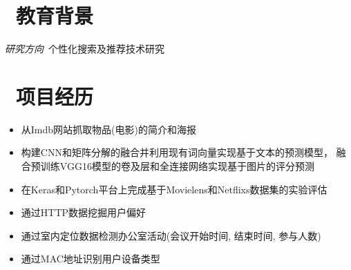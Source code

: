 \documentclass{resume}
\begin{document}


 
\section{\faGraduationCap\  教育背景}
\textit{研究方向}\ 个性化搜索及推荐技术研究

\section{\faUsers\ 项目经历}
\begin{onehalfspacing}
\begin{itemize}
	\item 从Imdb网站抓取物品(电影)的简介和海报
	\item 构建CNN和矩阵分解的融合并利用现有词向量实现基于文本的预测模型， 融合预训练VGG16模型的卷及层和全连接网络实现基于图片的评分预测
	\item 在Keras和Pytorch平台上完成基于Movielens和Netflixs数据集的实验评估
\end{itemize}
\end{onehalfspacing}
\begin{onehalfspacing}
\begin{itemize}
  \item 通过HTTP数据挖掘用户偏好
  \item 通过室内定位数据检测办公室活动(会议开始时间, 结束时间, 参与人数)
  \item 通过MAC地址识别用户设备类型
\end{itemize}
\end{onehalfspacing}
\end{document}
